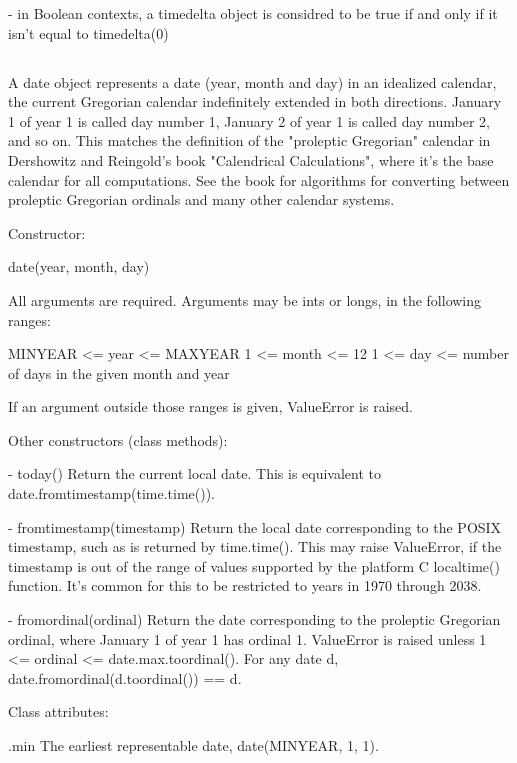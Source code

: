 {    - in Boolean contexts, a timedelta object is considred to be true
      if and only if it isn't equal to timedelta(0)


\subsection{ \label{datetime-date}}

A date object represents a date (year, month and day) in an idealized
calendar, the current Gregorian calendar indefinitely extended in both
directions.  January 1 of year 1 is called day number 1, January 2 of year
1 is called day number 2, and so on.  This matches the definition of the
"proleptic Gregorian" calendar in Dershowitz and Reingold's book
"Calendrical Calculations", where it's the base calendar for all
computations.  See the book for algorithms for converting between
proleptic Gregorian ordinals and many other calendar systems.

Constructor:

    date(year, month, day)

    All arguments are required.  Arguments may be ints or longs, in the
    following ranges:

        MINYEAR <= year <= MAXYEAR
        1 <= month <= 12
        1 <= day <= number of days in the given month and year

    If an argument outside those ranges is given, ValueError is raised.

Other constructors (class methods):

  - today()
    Return the current local date.  This is equivalent to
    date.fromtimestamp(time.time()).

  - fromtimestamp(timestamp)
    Return the local date corresponding to the POSIX timestamp, such as
    is returned by time.time().  This may raise ValueError, if the
    timestamp is out of the range of values supported by the platform C
    localtime() function.  It's common for this to be restricted to
    years in 1970 through 2038.

  - fromordinal(ordinal)
    Return the date corresponding to the proleptic Gregorian ordinal,
    where January 1 of year 1 has ordinal 1.  ValueError is raised
    unless 1 <= ordinal <= date.max.toordinal().  For any date d,
    date.fromordinal(d.toordinal()) == d.

Class attributes:

    .min
        The earliest representable date, date(MINYEAR, 1, 1).

}
